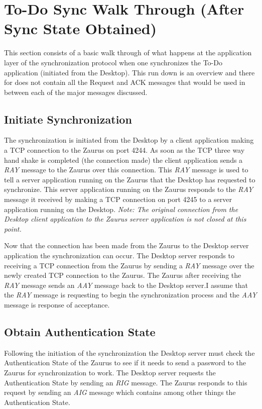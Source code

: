     \section{To-Do Sync Walk Through (After Sync State Obtained)}

    This section consists of a basic walk through of what happens at the
    application layer of the synchronization protocol when one synchronizes
    the To-Do application (initiated from the Desktop). This run down is an
    overview and there for does not contain all the Request and ACK messages
    that would be used in between each of the major messages discussed.

    \subsection{Initiate Synchronization}
    The synchronization is initiated from the Desktop by a client application
    making a TCP connection to the Zaurus on port 4244. As soon as the TCP
    three way hand shake is completed (the connection made) the client
    application sends a \emph{RAY} message to the Zaurus over this
    connection. This \emph{RAY} message is used to tell a server application
    running on the Zaurus that the Desktop has requested to synchronize. This
    server application running on the Zaurus responds to the \emph{RAY}
    message it received by making a TCP connection on port 4245 to a server
    application running on the Desktop. \emph{Note: The original connection
    from the Desktop client application to the Zaurus server application is
    not closed at this point.}

    Now that the connection has been made from the Zaurus to the Desktop
    server application the synchronization can occur. The Desktop server
    responds to receiving a TCP connection from the Zaurus by sending a
    \emph{RAY} message over the newly created TCP connection to the
    Zaurus. The Zaurus after receiving the \emph{RAY} message sends an
    \emph{AAY} message back to the Desktop server.I assume that the \emph{RAY}
    message is requesting to begin the synchronization process and the
    \emph{AAY} message is response of acceptance.

    \subsection{Obtain Authentication State}
    Following the initiation of the synchronization the Desktop server must
    check the Authentication State of the Zaurus to see if it needs to send a
    password to the Zaurus for synchronization to work. The Desktop server
    requests the Authentication State by sending an \emph{RIG} message. The
    Zaurus responds to this request by sending an \emph{AIG} message which
    contains among other things the Authentication State.

